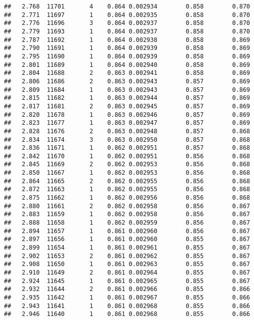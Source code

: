 \documentclass[
]{book}
\begin{document}
\begin{verbatim}
##   2.768  11701       4    0.864 0.002934        0.858        0.870
##   2.771  11697       1    0.864 0.002935        0.858        0.870
##   2.776  11696       3    0.864 0.002937        0.858        0.870
##   2.779  11693       1    0.864 0.002937        0.858        0.870
##   2.787  11692       1    0.864 0.002938        0.858        0.869
##   2.790  11691       1    0.864 0.002939        0.858        0.869
##   2.795  11690       1    0.864 0.002939        0.858        0.869
##   2.801  11689       1    0.864 0.002940        0.858        0.869
##   2.804  11688       2    0.863 0.002941        0.858        0.869
##   2.806  11686       2    0.863 0.002943        0.857        0.869
##   2.809  11684       1    0.863 0.002943        0.857        0.869
##   2.815  11682       1    0.863 0.002944        0.857        0.869
##   2.817  11681       2    0.863 0.002945        0.857        0.869
##   2.820  11678       1    0.863 0.002946        0.857        0.869
##   2.823  11677       1    0.863 0.002947        0.857        0.869
##   2.828  11676       2    0.863 0.002948        0.857        0.868
##   2.834  11674       3    0.863 0.002950        0.857        0.868
##   2.836  11671       1    0.862 0.002951        0.857        0.868
##   2.842  11670       1    0.862 0.002951        0.856        0.868
##   2.845  11669       2    0.862 0.002953        0.856        0.868
##   2.850  11667       1    0.862 0.002953        0.856        0.868
##   2.864  11665       2    0.862 0.002955        0.856        0.868
##   2.872  11663       1    0.862 0.002955        0.856        0.868
##   2.875  11662       1    0.862 0.002956        0.856        0.868
##   2.880  11661       2    0.862 0.002958        0.856        0.867
##   2.883  11659       1    0.862 0.002958        0.856        0.867
##   2.888  11658       1    0.862 0.002959        0.856        0.867
##   2.894  11657       1    0.861 0.002960        0.856        0.867
##   2.897  11656       1    0.861 0.002960        0.855        0.867
##   2.899  11654       1    0.861 0.002961        0.855        0.867
##   2.902  11653       2    0.861 0.002962        0.855        0.867
##   2.908  11650       1    0.861 0.002963        0.855        0.867
##   2.910  11649       2    0.861 0.002964        0.855        0.867
##   2.924  11645       1    0.861 0.002965        0.855        0.867
##   2.932  11644       2    0.861 0.002966        0.855        0.866
##   2.935  11642       1    0.861 0.002967        0.855        0.866
##   2.943  11641       1    0.861 0.002968        0.855        0.866
##   2.946  11640       1    0.861 0.002968        0.855        0.866

\end{verbatim}
\end{document}
